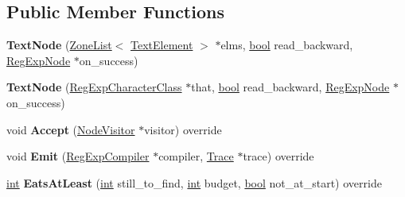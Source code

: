 \subsection*{Public Member Functions}
\begin{DoxyCompactItemize}
\item 
\mbox{\label{classv8_1_1internal_1_1TextNode_ad82f037bc18bc07fe99b03473cca0713}} 
{\bfseries Text\+Node} (\mbox{\hyperlink{classv8_1_1internal_1_1ZoneList}{Zone\+List}}$<$ \mbox{\hyperlink{classv8_1_1internal_1_1TextElement}{Text\+Element}} $>$ $\ast$elms, \mbox{\hyperlink{classbool}{bool}} read\+\_\+backward, \mbox{\hyperlink{classv8_1_1internal_1_1RegExpNode}{Reg\+Exp\+Node}} $\ast$on\+\_\+success)
\item 
\mbox{\label{classv8_1_1internal_1_1TextNode_a37623d87d91c4df2206bd2e39705caf0}} 
{\bfseries Text\+Node} (\mbox{\hyperlink{classv8_1_1internal_1_1RegExpCharacterClass}{Reg\+Exp\+Character\+Class}} $\ast$that, \mbox{\hyperlink{classbool}{bool}} read\+\_\+backward, \mbox{\hyperlink{classv8_1_1internal_1_1RegExpNode}{Reg\+Exp\+Node}} $\ast$on\+\_\+success)
\item 
\mbox{\label{classv8_1_1internal_1_1TextNode_a0ae2eb39c21a52e8bd01d76cd6d3dfc9}} 
void {\bfseries Accept} (\mbox{\hyperlink{classv8_1_1internal_1_1NodeVisitor}{Node\+Visitor}} $\ast$visitor) override
\item 
\mbox{\label{classv8_1_1internal_1_1TextNode_ab4ef65dbfccabe8abcdb129a259bd282}} 
void {\bfseries Emit} (\mbox{\hyperlink{classv8_1_1internal_1_1RegExpCompiler}{Reg\+Exp\+Compiler}} $\ast$compiler, \mbox{\hyperlink{classv8_1_1internal_1_1Trace}{Trace}} $\ast$trace) override
\item 
\mbox{\label{classv8_1_1internal_1_1TextNode_a944bd7d0b24872c34a3a4f70c8352d50}} 
\mbox{\hyperlink{classint}{int}} {\bfseries Eats\+At\+Least} (\mbox{\hyperlink{classint}{int}} still\+\_\+to\+\_\+find, \mbox{\hyperlink{classint}{int}} budget, \mbox{\hyperlink{classbool}{bool}} not\+\_\+at\+\_\+start) override
\item 
\mbox{\label{classv8_1_1internal_1_1TextNode_a56cf231eb07793c5fff6026b831a5a5a}} 

\end{DoxyCompactItemize}

